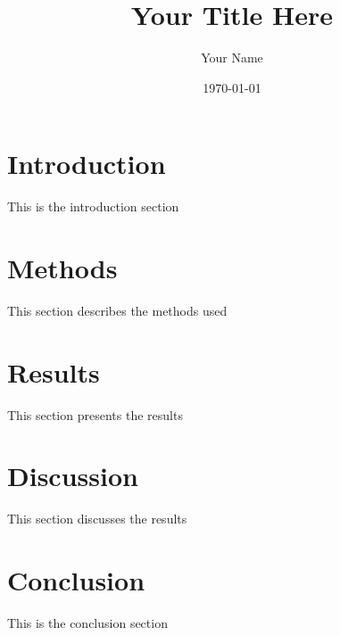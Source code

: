 \documentclass{article}
\title{Your Title Here}
\author{Your Name}
\date{\today}
\begin{document}
\maketitle

\section{Introduction}
This is the introduction section

\section{Methods}
This section describes the methods used

\section{Results}
This section presents the results

\section{Discussion}
This section discusses the results

\section{Conclusion}
This is the conclusion section



\end{document}
